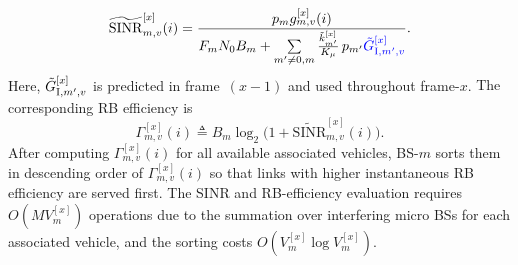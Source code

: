 \documentclass[conference, a4paper]{IEEEtran}
\newcommand{\rev}[1]{\textcolor{revisioncolor}{{}#1}}
\newif\ifshowdeletions
\newcommand{\currentdel}[1]{\ifshowdeletions\textcolor{deletioncolor}{\sout{#1}}\fi}
\theoremstyle{remark}
\begin{document}
\currentdel{Since the exact inter-cell interference in slot-$i$ is unknown, BS-$m$ approximates the SINR by leveraging the estimated frame-averaged RB usages $\{\Tilde{k}_{m'}^{[x]}\}$ obtained from GAP-HO:}
\begin{equation}
\label{eq:OTR-RA_SINR_hat}
    \widetilde{\mathrm{SINR}}_{m,v}^{[x]}(i)
    =
    \frac{p_m g_{m,v}^{[x]}(i)}
         {F_m N_0 B_m
          + \sum\limits_{m'\neq 0,m}
            \frac{\Tilde{k}_{m'}^{[x]}}{K_\mu}\, p_{m'} \currentdel{\ensuremath{g_{{\rm I},m',v}^{[x]}(i)}}\rev{\Tilde{G}_{{\rm I},m',v}^{[x]}}}.
\end{equation}
\rev{Here, $\Tilde{G}_{{\rm I},m',v}^{[x]}$ is predicted in frame~$(x-1)$ and used throughout frame-$x$.}
The corresponding RB efficiency is
\begin{equation}
    \label{eq:OTR-RA_RBe}
    \Gamma_{m,v}^{[x]}(i)
    \triangleq
    B_m\log_2\!\bigl(1+\widetilde{\mathrm{SINR}}_{m,v}^{[x]}(i)\bigr).
\end{equation}
After computing $\Gamma_{m,v}^{[x]}(i)$ for all \rev{available }associated vehicles, BS-$m$ sorts them in descending order of $\Gamma_{m,v}^{[x]}(i)$ so that links with higher instantaneous RB efficiency are served first. The SINR and RB-efficiency evaluation requires $O (MV^{[x]}_{m} )$ operations due to the summation over interfering micro BSs for each associated vehicle, and the sorting costs $O (V^{[x]}_{m}\log V^{[x]}_{m} )$.
\end{document}

